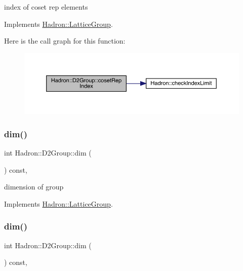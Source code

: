 index of coset rep elements 

Implements \mbox{\hyperlink{structHadron_1_1LatticeGroup_a7e3b9b5e2f596e6c40d64aa939a3ad6c}{Hadron\+::\+Lattice\+Group}}.

Here is the call graph for this function\+:
\nopagebreak
\begin{figure}[H]
\begin{center}
\leavevmode
\includegraphics[width=350pt]{d8/de7/structHadron_1_1D2Group_a41bfcefe5a659b99db790f822123593f_cgraph}
\end{center}
\end{figure}
\mbox{\label{structHadron_1_1D2Group_a937ab7d9b4b21da1331b0c85728f7db9}} 
\subsubsection{\texorpdfstring{dim()}{dim()}\hspace{0.1cm}{\footnotesize\ttfamily [1/2]}}
{\footnotesize\ttfamily int Hadron\+::\+D2\+Group\+::dim (\begin{DoxyParamCaption}{ }\end{DoxyParamCaption}) const\hspace{0.3cm}{\ttfamily [inline]}, {\ttfamily [virtual]}}

dimension of group 

Implements \mbox{\hyperlink{structHadron_1_1LatticeGroup_abd8415698323796ef6a8605796ee3bea}{Hadron\+::\+Lattice\+Group}}.

\mbox{\label{structHadron_1_1D2Group_a937ab7d9b4b21da1331b0c85728f7db9}} 
\subsubsection{\texorpdfstring{dim()}{dim()}\hspace{0.1cm}{\footnotesize\ttfamily [2/2]}}
{\footnotesize\ttfamily int Hadron\+::\+D2\+Group\+::dim (\begin{DoxyParamCaption}{ }\end{DoxyParamCaption}) const\hspace{0.3cm}{\ttfamily [inline]}, {\ttfamily [virtual]}}

